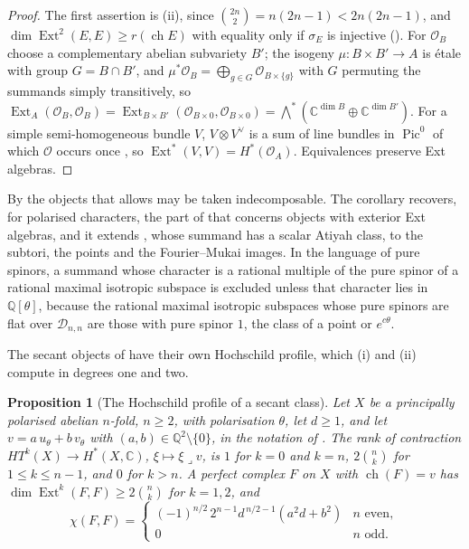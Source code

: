 \documentclass[11pt,reqno]{amsart}
\theoremstyle{plain}
\newtheorem{proposition}[theorem]{Proposition}
\theoremstyle{definition}
\theoremstyle{remark}
\newcommand{\QQ}{\mathbb{Q}}
\newcommand{\CC}{\mathbb{C}}
\newcommand{\cO}{\mathcal{O}}
\newcommand{\cD}{\mathcal{D}}
\DeclareMathOperator{\ch}{ch}
\DeclareMathOperator{\Ext}{Ext}
\DeclareMathOperator{\Pic}{Pic}
\begin{document}
\begin{proof}
The first assertion is (ii), since
$\binom{2n}{2}=n(2n-1)<2n(2n-1)$, and $\dim\Ext^{2}(E,E)\ge r(\ch E)$ with
equality only if $\sigma_{E}$ is injective (). For
$\cO_{B}$ choose a complementary abelian subvariety $B'$; the isogeny
$\mu\colon B\times B'\to A$ is \'etale with group $G=B\cap B'$, and
$\mu^{*}\cO_{B}=\bigoplus_{g\in G}\cO_{B\times\{g\}}$ with $G$ permuting the
summands simply transitively, so $\Ext_{A}(\cO_{B},\cO_{B})
=\Ext_{B\times B'}(\cO_{B\times0},\cO_{B\times0})=\bigwedge^{*}(\CC^{\dim B}
\oplus\CC^{\dim B'})$. For a simple semi-homogeneous bundle $V$,
$V\otimes V^{\vee}$ is a sum of line bundles in $\Pic^{0}$ of which $\cO$ occurs
once \cite{Muk78}, so $\Ext^{*}(V,V)=H^{*}(\cO_{A})$. Equivalences preserve
Ext algebras.
\end{proof}

By  the objects that 
allows may be taken indecomposable. The corollary recovers, for
polarised characters, the part of \cite[Theorem~2.32]{paperIII} that concerns objects with
exterior Ext algebras, and it extends , whose summand
has a scalar Atiyah class, to the subtori, the points and the Fourier--Mukai
images. In the language of pure spinors, a summand whose
character is a rational multiple of the pure spinor of a rational maximal
isotropic subspace is excluded unless that character lies in $\QQ[\theta]$,
because the rational maximal isotropic subspaces whose pure spinors are flat
over $\cD_{n,n}$ are those with pure spinor $1$, the class of a point or
$e^{c\theta}$.

The secant objects of \cite[Section~14]{paperI} have their own Hochschild
profile, which (i) and (ii) compute in degrees one and two.

\begin{proposition}[The Hochschild profile of a secant class]
\label{prop:secantprofile}
Let $X$ be a principally polarised abelian $n$-fold, $n\ge2$, with
polarisation $\theta$, let $d\ge1$, and let $v=a\,u_{\theta}+b\,v_{\theta}$
with $(a,b)\in\QQ^{2}\setminus\{0\}$, in the notation of \cite[(30)]{paperI}. The
rank of contraction $HT^{k}(X)\to H^{*}(X,\CC)$, $\xi\mapsto\xi\lrcorner v$, is
$1$ for $k=0$ and $k=n$, $2\binom{n}{k}$ for $1\le k\le n-1$, and $0$ for
$k>n$. A perfect complex $F$ on $X$ with $\ch(F)=v$ has
$\dim\Ext^{k}(F,F)\ge2\binom{n}{k}$ for $k=1,2$, and
\[
  \chi(F,F)=\begin{cases}
    (-1)^{n/2}\,2^{n-1}d^{\,n/2-1}(a^{2}d+b^{2}) & n\text{ even},\\
    0 & n\text{ odd}.
  \end{cases}
\]
\end{proposition}
\end{document}
